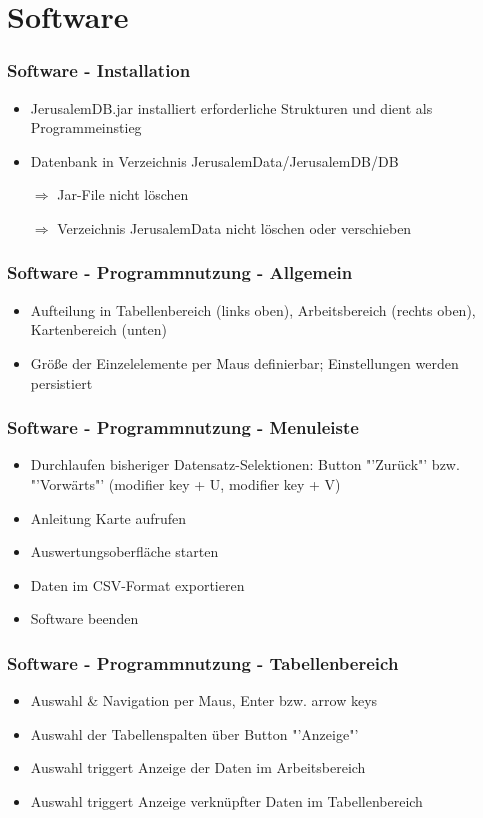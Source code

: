\documentclass{beamer}
\begin{document}
\section{Software}	
\begin{frame}
			\frametitle{Software - Installation} 
				\begin{itemize}
					\item JerusalemDB.jar installiert erforderliche Strukturen und dient als Programmeinstieg
					\item Datenbank in Verzeichnis JerusalemData/JerusalemDB/DB
					\item[$\Rightarrow$] Jar-File nicht löschen
					\item[$\Rightarrow$] 	Verzeichnis JerusalemData nicht löschen oder verschieben
				\end{itemize}
	\end{frame}	

\begin{frame}
			\frametitle{Software - Programmnutzung - Allgemein} 
				\begin{itemize}
					\item Aufteilung in Tabellenbereich (links oben), Arbeitsbereich (rechts oben), Kartenbereich (unten)
					\item Größe der Einzelelemente per Maus definierbar; Einstellungen werden persistiert
				\end{itemize}
	\end{frame}	
	
\begin{frame}
			\frametitle{Software - Programmnutzung - Menuleiste} 
				\begin{itemize}
					\item Durchlaufen bisheriger Datensatz-Selektionen: Button "'Zurück"' bzw. "'Vorwärts"' (modifier key + U, modifier key + V)					
					\item Anleitung Karte aufrufen
					\item Auswertungsoberfläche starten
					\item Daten im CSV-Format exportieren
					\item Software beenden
				\end{itemize}
	\end{frame}		
	
	\begin{frame}
			\frametitle{Software - Programmnutzung - Tabellenbereich} 
				\begin{itemize}
					\item Auswahl \& Navigation per Maus, Enter bzw. arrow keys
					\item Auswahl der Tabellenspalten über Button "'Anzeige"'
					\item Auswahl triggert Anzeige der Daten im Arbeitsbereich
					\item Auswahl triggert Anzeige verknüpfter Daten im Tabellenbereich
				\end{itemize}
	\end{frame}	
	
\end{document}
